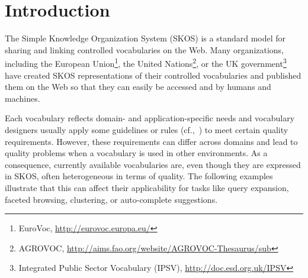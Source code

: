 
\section{Introduction}\label{sec:introduction}


The Simple Knowledge Organization System (SKOS)  is a standard model for sharing and linking controlled vocabularies on the Web. Many organizations, including the European Union\footnote{EuroVoc, \url{http://eurovoc.europa.eu/}}, the United Nations\footnote{AGROVOC, \url{http://aims.fao.org/website/AGROVOC-Thesaurus/sub}}, or the UK government\footnote{Integrated Public Sector Vocabulary (IPSV), \url{http://doc.esd.org.uk/IPSV}} have created SKOS representations of their controlled vocabularies and published them on the Web so that they can easily be accessed and by humans and machines.


Each vocabulary reflects domain- and application-specific needs and vocabulary designers usually apply some guidelines or rules (cf.,~\cite{Coronado2009}) to meet certain quality requirements. However, these requirements can differ across domains and lead to quality problems when a vocabulary is used in other environments. As a consequence, currently available vocabularies are, even though they are expressed in SKOS, often heterogeneous in terms of quality. The following examples illustrate that this can affect their applicability for tasks like query expansion, faceted browsing, clustering, or auto-complete suggestions. 

